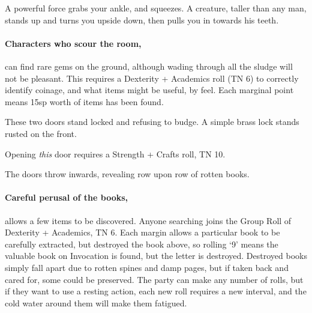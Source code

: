 \begin{boxtext}

  A powerful force grabs your ankle, and squeezes.
  A creature, taller than any man, stands up and turns you upside down, then pulls you in towards his teeth.

\end{boxtext}


\paragraph{Characters who scour the room,}
can find rare gems on the ground, although wading through all the sludge will not be pleasant.
This requires a Dexterity + Academics roll (TN 6) to correctly identify coinage, and what items might be useful, by feel.
Each marginal point means 15sp worth of items has been found.


\begin{boxtext}

  These two doors stand locked and refusing to budge.  A simple brass lock stands rusted on the front.

\end{boxtext}

Opening \emph{this} door requires a Strength + Crafts roll, TN 10.

\begin{boxtext}
  The doors throw inwards, revealing row upon row of rotten books.
\end{boxtext}

\paragraph{Careful perusal of the books,}
allows a few items to be discovered.
Anyone searching joins the Group Roll of Dexterity + Academics, TN 6.
Each margin allows a particular book to be carefully extracted, but destroyed the book above, so rolling `9' means the valuable book on Invocation is found, but the letter is destroyed.
Destroyed books simply fall apart due to rotten spines and damp pages, but if taken back and cared for, some could be preserved.
The party can make any number of rolls, but if they want to use a resting action, each new roll requires a new \gls{interval}, and the cold water around them will make them fatigued.

